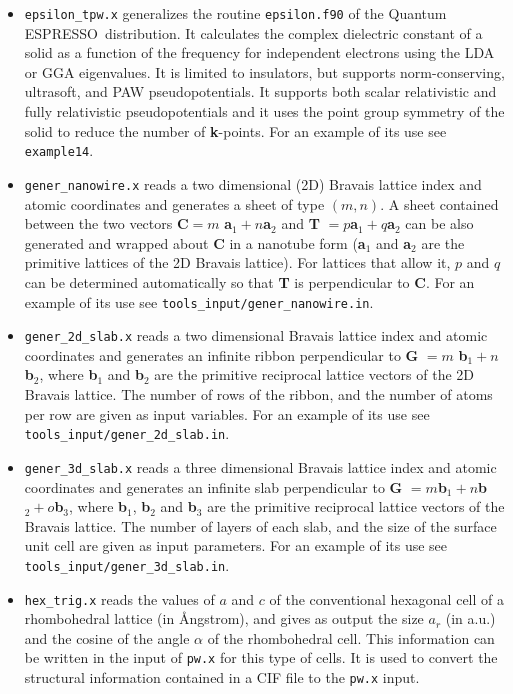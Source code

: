 \documentclass[12pt,a4paper,twoside]{report}
\def\qe{{\sc Quantum ESPRESSO}}
\begin{document}
\begin{itemize}
\item \texttt{epsilon\_tpw.x} generalizes the routine
\texttt{epsilon.f90} of the \qe\ distribution. It calculates the 
complex dielectric
constant of a solid as a function of the frequency for independent electrons
using the LDA or GGA eigenvalues. It is limited to insulators, but supports
norm-conserving, ultrasoft, and PAW pseudopotentials. It supports both scalar
relativistic and fully relativistic pseudopotentials and it uses the point
group symmetry of the solid to reduce the number of {\bf k}-points.
For an example of its use see \texttt{example14}.

\item \texttt{gener\_nanowire.x} reads a two dimensional (2D)
Bravais lattice index and atomic coordinates and generates a sheet of type
$(m,n)$. A sheet contained between the two vectors 
{\bf C}$ = m$ {\bf a}$_1 + n ${\bf a}$_2$ and {\bf T} $= p ${\bf a}$_1 + q ${\bf a}$_2$
can be also generated and wrapped about {\bf C} in a nanotube form 
({\bf a}$_1$ and {\bf a}$_2$ are the primitive lattices of the 2D Bravais 
lattice). 
For lattices that allow it, $p$ and $q$ can be determined automatically so that 
{\bf T} is perpendicular to {\bf C}.
For an example of its use see \texttt{tools\_input/gener\_nanowire.in}.

\item \texttt{gener\_2d\_slab.x} reads a two dimensional 
Bravais lattice index and atomic coordinates and generates an infinite ribbon
perpendicular to {\bf G} $= m$ {\bf b}$_1 + n ${\bf b}$_2$, where 
{\bf b}$_1$ and {\bf b}$_2$ are the primitive reciprocal lattice vectors 
of the 2D Bravais lattice. The number of rows of the ribbon, and the number of
atoms per row are given as input variables.
For an example of its use see \texttt{tools\_input/gener\_2d\_slab.in}.

\item \texttt{gener\_3d\_slab.x} reads a three dimensional
Bravais lattice index and atomic coordinates and generates an infinite slab
perpendicular to {\bf G} $= m ${\bf b}$_1 + n ${\bf b}$_2 + o ${\bf b}$_3$, 
where {\bf b}$_1$, {\bf b}$_2$ and {\bf b}$_3$ are the primitive reciprocal 
lattice
vectors of the Bravais lattice. The number of layers of each slab, and the
size of the surface unit cell are given as input parameters.
For an example of its use see \texttt{tools\_input/gener\_3d\_slab.in}.

\item \texttt{hex\_trig.x} reads the values of $a$ and $c$
of the conventional hexagonal cell of a rhombohedral lattice (in \AA ngstrom),
and gives as output the size $a_r$ (in a.u.) and the cosine of the angle
$\alpha$ of the rhombohedral cell. This information can
be written in the input of \texttt{pw.x} for this type of cells. It
is used to convert the structural information contained in a CIF file
to the \texttt{pw.x} input.


\end{itemize}
\end{document}
